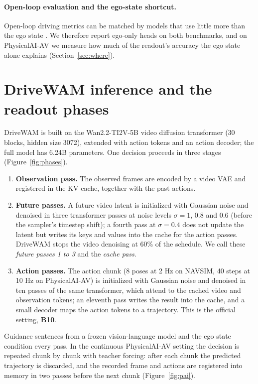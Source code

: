 \documentclass[10pt]{article}
\begin{document}
\paragraph{Open-loop evaluation and the ego-state shortcut.} Open-loop driving metrics can be matched by models that use little more than the ego state \citep{zhai2023admlp,li2024egostatus}. We therefore report ego-only heads on both benchmarks, and on PhysicalAI-AV we measure how much of the readout's accuracy the ego state alone explains (Section~\ref{sec:where}).

\section{DriveWAM inference and the readout phases}
\label{sec:background}

DriveWAM is built on the Wan2.2-TI2V-5B video diffusion transformer (30 blocks, hidden size 3072), extended with action tokens and an action decoder; the full model has 6.24B parameters. One decision proceeds in three stages (Figure~\ref{fig:phases}).
\begin{enumerate}
\item \textbf{Observation pass.} The observed frames are encoded by a video VAE and registered in the KV cache, together with the past actions.
\item \textbf{Future passes.} A future video latent is initialized with Gaussian noise and denoised in three transformer passes at noise levels $\sigma = 1$, $0.8$ and $0.6$ (before the sampler's timestep shift); a fourth pass at $\sigma = 0.4$ does not update the latent but writes its keys and values into the cache for the action passes. DriveWAM stops the video denoising at 60\% of the schedule. We call these \emph{future passes 1 to 3} and the \emph{cache pass}.
\item \textbf{Action passes.} The action chunk (8 poses at 2 Hz on NAVSIM, 40 steps at 10 Hz on PhysicalAI-AV) is initialized with Gaussian noise and denoised in ten passes of the same transformer, which attend to the cached video and observation tokens; an eleventh pass writes the result into the cache, and a small decoder maps the action tokens to a trajectory. This is the official setting, \textbf{B10}.
\end{enumerate}
Guidance sentences from a frozen vision-language model and the ego state condition every pass. In the continuous PhysicalAI-AV setting the decision is repeated chunk by chunk with teacher forcing: after each chunk the predicted trajectory is discarded, and the recorded frame and actions are registered into memory in two passes before the next chunk (Figure~\ref{fig:pai}).
\end{document}

